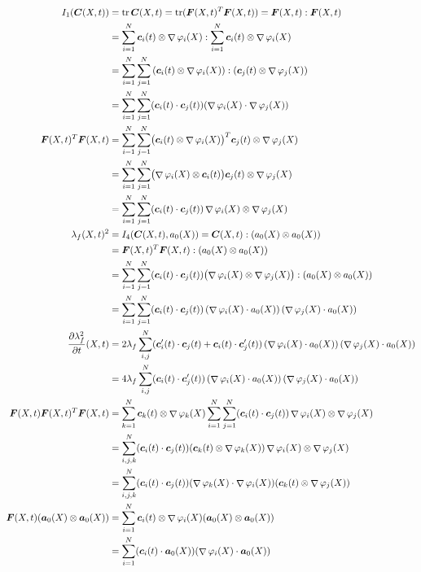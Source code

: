 \documentclass[a4paper,12pt]{article}
\DeclareMathOperator{\divergence}{\nabla}
\DeclareMathOperator{\tr}{tr}
\begin{document}
\begin{align*}
	I_1(\vC(X,t)) &= \tr\vC(X,t) = \tr(\vF(X,t)^T\vF(X,t)) = \vF(X,t) : \vF(X,t)\\
	&= \sumi \vc_i(t)\otimes \divergence\varphi_i(X) : \sumi \vc_i(t)\otimes \divergence\varphi_i(X)\\
	&= \sumi\sumj \left(\vc_i(t)\otimes \divergence\varphi_i(X)\right) : (\vc_j(t)\otimes \divergence\varphi_j(X))\\
	&= \sumi\sumj (\vc_i(t) \cdot \vc_j(t))(\divergence\varphi_i(X) \cdot \divergence\varphi_j(X))\\
	\vF(X,t)^T\vF(X,t) &= \sumi\sumj \bigl(\vc_i(t)\otimes\divergence\varphi_i(X)\bigr)^T\vc_j(t)\otimes\divergence\varphi_j(X)\\
	 &= \sumi\sumj \bigl(\divergence\varphi_i(X)\otimes\vc_i(t)\bigr)\vc_j(t)\otimes\divergence\varphi_j(X)\\
	 &=\sumi\sumj (\vc_i(t)\cdot \vc_j(t))\divergence\varphi_i(X)\otimes\divergence\varphi_j(X)\\
	\lambda_f(X,t)^2 &=I_4(\vC(X,t),a_0(X)) = \vC(X,t):(a_0(X)\otimes a_0(X))\\
			&=  \vF(X,t)^T\vF(X,t) : (a_0(X)\otimes a_0(X))\\
			&=  \sumi\sumj (\vc_i(t)\cdot \vc_j(t))\bigl(\divergence\varphi_i(X)\otimes\divergence\varphi_j(X)\bigr) : (a_0(X)\otimes a_0(X))\\
			&=  \sumi\sumj (\vc_i(t)\cdot \vc_j(t))\left(\divergence\varphi_i(X)\cdot a_0(X)\right)(\divergence\varphi_j(X)\cdot a_0(X))\\
	\d{\lambda_f^2}{t}(X,t) &= 2\lambda_f \suml{i,j}{N} (\vc'_i(t)\cdot \vc_j(t) + \vc_i(t)\cdot \vc'_j(t))\left(\divergence\varphi_i(X)\cdot a_0(X)\right)(\divergence\varphi_j(X)\cdot a_0(X))\\
		&= 4\lambda_f \suml{i,j}{N} (\vc_i(t)\cdot \vc'_j(t))\left(\divergence\varphi_i(X)\cdot a_0(X)\right)(\divergence\varphi_j(X)\cdot a_0(X))\\
    \vF(X,t)\vF(X,t)^T\vF(X,t) &= \sumk\vc_k(t)\otimes\divergence\varphi_k(X)\sumi\sumj (\vc_i(t)\cdot \vc_j(t))\divergence\varphi_i(X)\otimes\divergence\varphi_j(X)\\
    	&= \suml{i,j,k}{N}(\vc_i(t)\cdot \vc_j(t))(\vc_k(t)\otimes\divergence\varphi_k(X))\divergence\varphi_i(X)\otimes\divergence\varphi_j(X)\\
    	&= \suml{i,j,k}{N}(\vc_i(t)\cdot \vc_j(t))(\divergence\varphi_k(X)\cdot\divergence\varphi_i(X))(\vc_k(t)\otimes\divergence\varphi_j(X))\\
    \vF(X,t)(\va_0(X)\otimes\va_0(X)) &= \sumi \vc_i(t)\otimes \divergence\varphi_i(X)(\va_0(X)\otimes\va_0(X))\\
    &= \sumi (\vc_i(t)\cdot \va_0(X))(\divergence\varphi_i(X)\cdot\va_0(X))
\end{align*}
\end{document}
